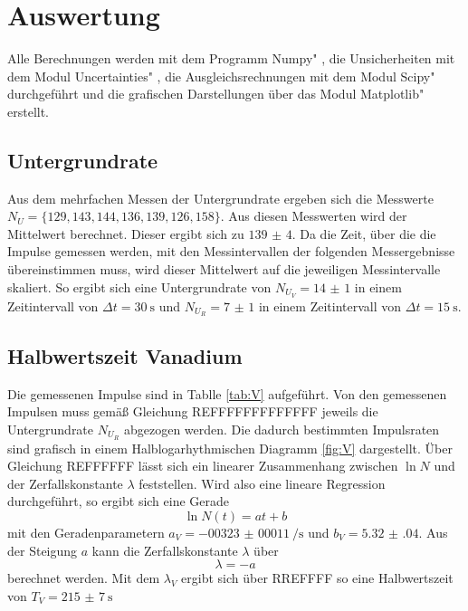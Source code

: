 \section{Auswertung}
\label{sec:Auswertung}

Alle Berechnungen werden mit dem Programm \glqq Numpy" \cite{numpy}, die Unsicherheiten mit dem Modul \glqq Uncertainties" \cite{uncertainties}, die Ausgleichsrechnungen mit dem Modul \glqq Scipy" \cite{scipy} durchgeführt und die grafischen Darstellungen über das Modul \glqq Matplotlib" \cite{matplotlib} erstellt.

\subsection{Untergrundrate}

Aus dem mehrfachen Messen der Untergrundrate ergeben sich die Messwerte $N_U=\{ 129, 143, 144, 136, 139, 126, 158 \}$. Aus diesen Messwerten wird der Mittelwert berechnet. Dieser ergibt sich zu $\num{139(4)}$. Da die Zeit, über die die Impulse gemessen werden, mit den Messintervallen der folgenden Messergebnisse übereinstimmen muss, wird  dieser Mittelwert auf die jeweiligen Messintervalle skaliert. So ergibt sich eine Untergrundrate von $N_{U_V}=\num{14(1)}$ in einem Zeitintervall von $\Delta t=\SI{30}{\s}$ und $N_{U_R}=\num{7(1)}$ in einem Zeitintervall von $\Delta t=\SI{15}{\s}$.

\subsection{Halbwertszeit Vanadium}

Die gemessenen Impulse sind in Tablle \ref{tab:V} aufgeführt. Von den gemessenen Impulsen muss gemäß Gleichung REFFFFFFFFFFFFF jeweils die Untergrundrate $N_{U_R}$ abgezogen werden. Die dadurch bestimmten Impulsraten sind grafisch in einem Halblogarhythmischen Diagramm \ref{fig:V} dargestellt. Über Gleichung REFFFFFF lässt sich ein linearer Zusammenhang zwischen $\ln{N}$ und der Zerfallskonstante $\lambda $ feststellen. Wird also eine lineare Regression durchgeführt, so ergibt sich eine Gerade
\begin{equation}
    \ln{N}(t)=at + b
    \label{eqn:gerade}
\end{equation}
mit den Geradenparametern $a_V=\SI[per-mode=reciprocal]{-00323(00011)}{\per\s}$ und $b_V=\num{5.32(04)}$. 
Aus der Steigung $a$ kann die Zerfallskonstante $\lambda$ über
\begin{equation}
    \lambda=-a
\label{eqn:lamb}
\end{equation}
berechnet werden. Mit dem $\lambda_V$ ergibt sich über RREFFFF so eine Halbwertszeit von $T_V=\SI{215(7)}{\s}$


